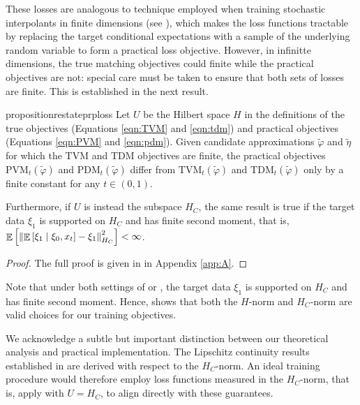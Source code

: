 These losses are analogous to technique employed when training stochastic interpolants in finite dimensions (see \citealp[][Theorems 2.7--2.8]{albergo2023stochasticinterpolantsunifyingframework}), which makes the loss functions tractable by replacing the target conditional expectations with a sample of the underlying random variable to form a practical loss objective. However, in infinitte dimensions, the true matching objectives could finite while the practical objectives are not: special care must be taken to ensure that both sets of losses are finite. This is established in the next result.
\begin{theorembox}
  \begin{restatable}{proposition}{restateprploss}\label{prp:loss}
    Let \(U\) be the Hilbert space \(H\) in the definitions of the true objectives (Equations \ref{eqn:TVM} and \ref{eqn:tdm}) and practical objectives (Equations \ref{eqn:PVM} and \ref{eqn:pdm}). Given candidate approximations \(\widetilde{\varphi}\) and \(\widetilde{\eta}\) for which the TVM and TDM objectives are finite, the practical objectives \(\mathrm{PVM}_{t}(\widetilde{\varphi})\) and \(\mathrm{PDM}_{t}(\widetilde{\varphi})\) differ from \(\mathrm{TVM}_{t}(\widetilde{\varphi})\) and \(\mathrm{TDM}_{t}(\widetilde{\varphi})\) only by a finite constant for any \(t \in (0, 1)\).

    Furthermore, if \(U\) is instead the subspace \(H_{C}\), the same result is true if the target data \(\xi_{1}\) is supported on \(H_{C}\) and has finite second moment, that is, \( \mathop{\mathbb{E}}\qty[\norm{\mathop{\mathbb{E}}\qty[\xi_{1} \mid \xi_{0}, x_{t}] - \xi_{1}}_{H_{C}}^{2}] < \infty\).
  \end{restatable}
\end{theorembox}
\begin{proof}
  The full proof is given in  in Appendix \ref{app:A}.
\end{proof}


Note that under both settings of  or , the target data \(\xi_{1}\) is supported on \(H_{C}\) and has finite second moment. Hence,  shows that both the \(H\)-norm and \(H_{C}\)-norm are valid choices for our training objectives.

We acknowledge a subtle but important distinction between our theoretical analysis and practical implementation. The Lipschitz continuity results established in  are derived with respect to the \(H_{C}\)-norm. An ideal training procedure would therefore employ loss functions measured in the \(H_{C}\)-norm, that is, apply  with \(U = H_{C}\), to align directly with these guarantees.

